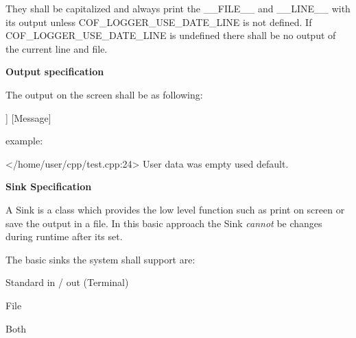 They shall be capitalized and always print the {\ttfamily \+\_\+\+\_\+\+F\+I\+L\+E\+\_\+\+\_\+} and {\ttfamily \+\_\+\+\_\+\+L\+I\+N\+E\+\_\+\+\_\+} with its output unless {\ttfamily C\+O\+F\+\_\+\+L\+O\+G\+G\+E\+R\+\_\+\+U\+S\+E\+\_\+\+D\+A\+T\+E\+\_\+\+L\+I\+NE} is not defined. If {\ttfamily C\+O\+F\+\_\+\+L\+O\+G\+G\+E\+R\+\_\+\+U\+S\+E\+\_\+\+D\+A\+T\+E\+\_\+\+L\+I\+NE} is undefined there shall be no output of the current line and file.

{\bfseries Output specification}

The output on the screen shall be as following\+:


\begin{DoxyCode}
[Level] [Date Time] [[File] [Line]] [Message]
\end{DoxyCode}


example\+:


\begin{DoxyCode}
[Info] [21-02-2018 22:03] </home/user/cpp/test.cpp:24> User data was empty used default.
\end{DoxyCode}


{\bfseries Sink Specification}

A {\ttfamily Sink} is a class which provides the low level function such as {\ttfamily print} on screen or save the output in a file. In this basic approach the {\ttfamily Sink} {\itshape cannot} be changes during runtime after its set.

The basic sinks the system shall support are\+:


\begin{DoxyItemize}
\item Standard in / out (Terminal)
\item File
\item Both 
\end{DoxyItemize}
